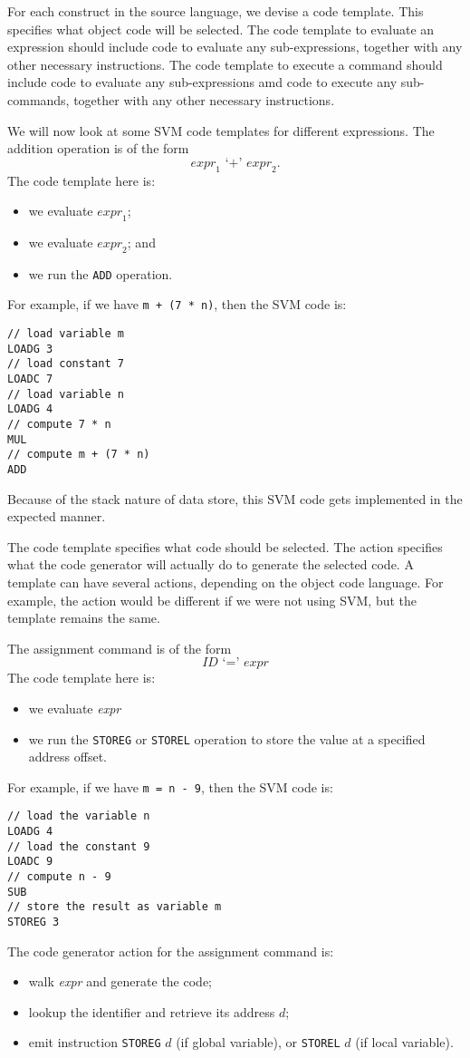 \documentclass[a4paper, openany]{memoir}
\begin{document}
For each construct in the source language, we devise a code template. This specifies what object code will be selected. The code template to evaluate an expression should include code to evaluate any sub-expressions, together with any other necessary instructions. The code template to execute a command should include code to evaluate any sub-expressions amd code to execute any sub-commands, together with any other necessary instructions.

We will now look at some SVM code templates for different expressions. The addition operation is of the form
\[\textit{expr}_1 \text{ `}\texttt{+}\text{' } \textit{expr}_2.\]
The code template here is: 
\begin{itemize}
    \item we evaluate $\textit{expr}_1$; 
    \item we evaluate $\textit{expr}_2$; and 
    \item we run the \texttt{ADD} operation.
\end{itemize}
For example, if we have \texttt{m + (7 * n)}, then the SVM code is:
\begin{lstlisting}[language=SVM]
// load variable m
LOADG 3
// load constant 7
LOADC 7
// load variable n
LOADG 4
// compute 7 * n
MUL
// compute m + (7 * n)
ADD
\end{lstlisting}
Because of the stack nature of data store, this SVM code gets implemented in the expected manner.

The code template specifies what code should be selected. The action specifies what the code generator will actually do to generate the selected code. A template can have several actions, depending on the object code language. For example, the action would be different if we were not using SVM, but the template remains the same.

The assignment command is of the form
\[\textit{ID} \text{ `}\texttt{=}\text{' } \textit{expr}\]
The code template here is:
\begin{itemize}
    \item we evaluate \textit{expr}
    \item we run the \texttt{STOREG} or \texttt{STOREL} operation to store the value at a specified address offset.
\end{itemize}
For example, if we have \texttt{m = n - 9}, then the SVM code is:
\begin{lstlisting}[language=SVM]
// load the variable n
LOADG 4
// load the constant 9
LOADC 9
// compute n - 9
SUB
// store the result as variable m
STOREG 3
\end{lstlisting}
The code generator action for the assignment command is:
\begin{itemize}
    \item walk \textit{expr} and generate the code;
    \item lookup the identifier and retrieve its address $d$;
    \item emit instruction \texttt{STOREG} $d$ (if global variable), or \texttt{STOREL} $d$ (if local variable).
\end{itemize}
\end{document}
